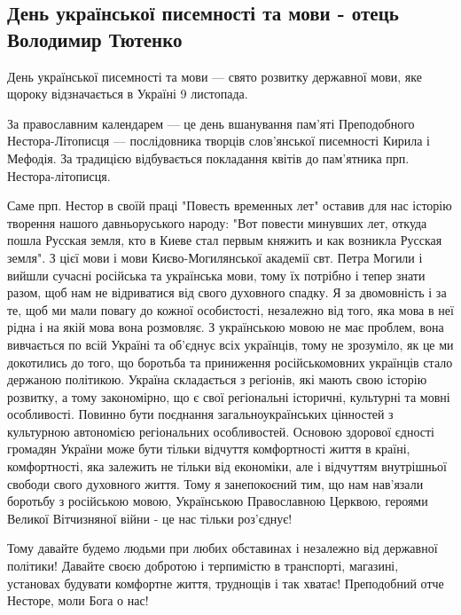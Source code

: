  
 
 

\subsection{День української писемності та мови - отець Володимир Тютенко}

День української писемності та мови — свято розвитку державної мови, яке щороку
відзначається в Україні 9 листопада. 

За православним календарем — це день вшанування пам'яті Преподобного
Нестора-Літописця — послідовника творців слов'янської писемності Кирила і
Мефодія.  За традицією відбувається покладання квітів до пам'ятника прп.
Нестора-літописця. 

Саме прп. Нестор в своїй праці "Повесть временных лет" оставив для нас історію
творення нашого давньоруського народу: "Вот повести минувших лет, откуда пошла
Русская земля, кто в Киеве стал первым княжить и как возникла Русская земля". З
цієї мови і мови Києво-Могилянської академії свт. Петра Могили і вийшли сучасні
російська та українська мови, тому їх потрібно і тепер знати разом, щоб нам не
відриватися від свого духовного спадку. Я за двомовність і за те, щоб ми мали
повагу до кожної особистості, незалежно від того, яка мова в неї рідна і на
якій мова вона розмовляє. З українською мовою не має проблем, вона вивчається
по всій Україні та об'єднує всіх українців, тому не зрозуміло, як це ми
докотились до того, що боротьба та приниження  російськомовних українців стало
держаною політикою. Україна складається з регіонів, які мають свою історію
розвитку, а тому закономірно, що є свої регіональні історичні, культурні та
мовні особливості. Повинно бути поєднання загальноукраїнських цінностей з
культурною автономією регіональних  особливостей.  Основою здорової єдності
громадян України може бути тільки  відчуття комфортності життя в країні,
комфортності, яка залежить не тільки від економіки, але і відчуттям внутрішньої
свободи свого духовного життя. Тому я занепокоєний тим, що нам нав'язали
боротьбу з російською мовою, Українською Православною Церквою, героями Великої
Вітчизняної війни - це нас тільки роз'єднує!  

Тому давайте будемо людьми при любих обставинах і незалежно від державної
політики! Давайте своєю добротою і терпимістю в транспорті, магазині, установах
будувати комфортне життя, труднощів і так хватає!  Преподобний отче Несторе,
моли Бога о нас!
